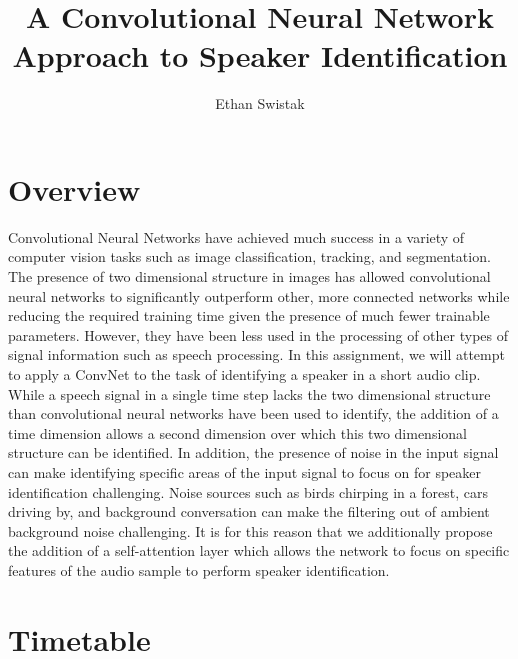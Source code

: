 \documentclass[12pt]{article}
\title{A Convolutional Neural Network Approach to Speaker Identification}
\author{Ethan Swistak}
\begin{document}
\maketitle

\section{Overview}

Convolutional Neural Networks have achieved much success in a variety of computer vision tasks such as image classification, tracking, and segmentation. The presence of two dimensional structure in images has allowed convolutional neural networks to significantly outperform other, more connected networks while reducing the required training time given the presence of much fewer trainable parameters. However, they have been less used in the processing of other types of signal information such as speech processing.  In this assignment, we will attempt to apply a ConvNet to the task of identifying a speaker in a short audio clip. While a speech signal in a single time step lacks the two dimensional structure than convolutional neural networks have been used to identify, the addition of a time dimension allows a second dimension over which this two dimensional structure can be identified. In addition, the presence of noise in the input signal can make identifying specific areas of the input signal to focus on for speaker identification challenging. Noise sources such as birds chirping in a forest, cars driving by, and background conversation can make the filtering out of ambient background noise challenging. It is for this reason that we additionally propose the addition of a self-attention layer which allows the network to focus on specific features of the audio sample to perform speaker identification.

\clearpage

\section{Timetable}
\end{document}
